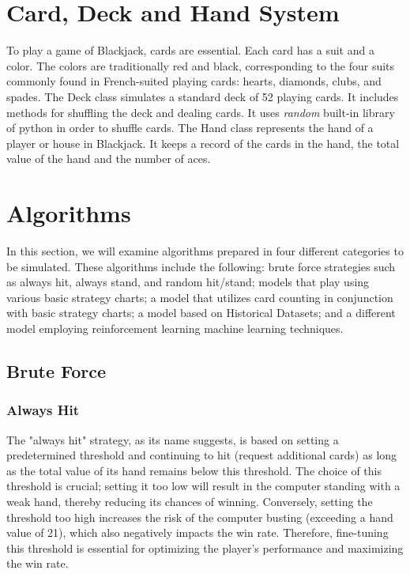 \documentclass[a4paper,12pt]{report}
\begin{document}
\section{Card, Deck and Hand System}
To play a game of Blackjack, cards are essential. Each card has a suit and a color. The colors are traditionally red and black, corresponding to the four suits commonly found in French-suited playing cards: hearts, diamonds, clubs, and spades. The Deck class simulates a standard deck of 52 playing cards. It includes methods for shuffling the deck and dealing cards. It uses \textit{random} built-in library of python in order to shuffle cards. The Hand class represents the hand of a player or house in Blackjack. It keeps a record of the cards in the hand, the total value of the hand and the number of aces.

\section{Algorithms}
\label{algorithms}
In this section, we will examine algorithms prepared in four different categories to be simulated. These algorithms include the following: brute force strategies such as always hit, always stand, and random hit/stand; models that play using various basic strategy charts; a model that utilizes card counting in conjunction with basic strategy charts; a model based on Historical Datasets; and a different model employing reinforcement learning machine learning techniques.

\subsection{Brute Force}
\subsubsection{Always Hit} 
The "always hit" strategy, as its name suggests, is based on setting a predetermined threshold and continuing to hit (request additional cards) as long as the total value of its hand remains below this threshold. The choice of this threshold is crucial; setting it too low will result in the computer standing with a weak hand, thereby reducing its chances of winning. Conversely, setting the threshold too high increases the risk of the computer busting (exceeding a hand value of 21), which also negatively impacts the win rate. Therefore, fine-tuning this threshold is essential for optimizing the player's performance and maximizing the win rate.
\end{document}
